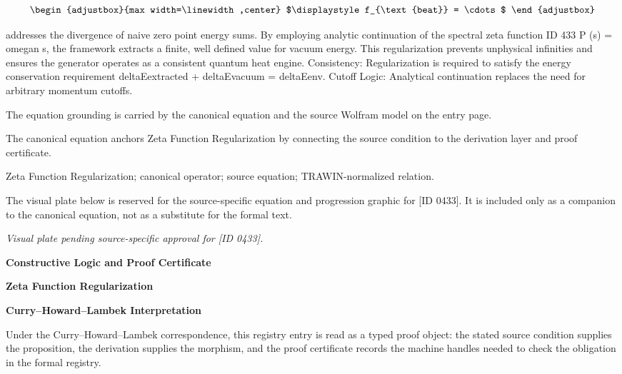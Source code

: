 \[
\begin{adjustbox}{max width=\linewidth,center}
$\displaystyle
f_{\text{beat}} = \cdots
$
\end{adjustbox}
\]

addresses the divergence of naive zero point energy sums. By employing analytic continuation of the spectral zeta function ID 433 P (s) = omegan s, the framework extracts a finite, well defined value for vacuum energy. This regularization prevents unphysical infinities and ensures the generator operates as a consistent quantum heat engine. Consistency: Regularization is required to satisfy the energy conservation requirement deltaEextracted + deltaEvacuum = deltaEenv. Cutoff Logic: Analytical continuation replaces the need for arbitrary momentum cutoffs.

The equation grounding is carried by the canonical equation and the source Wolfram model on the entry page.

The canonical equation anchors Zeta Function Regularization by connecting the source condition to the derivation layer and proof certificate.

Zeta Function Regularization; canonical operator; source equation; TRAWIN-normalized relation.
\endgroup

\begingroup\footnotesize\sloppy
The visual plate below is reserved for the source-specific equation and progression graphic for [ID 0433]. It is included only as a companion to the canonical equation, not as a substitute for the formal text.
\par\endgroup
\begingroup\footnotesize\itshape
Visual plate pending source-specific approval for [ID 0433].
\par\endgroup

\clearpage
\begingroup\tzpsupportsetup
\noindent\textbf{\fontsize{10.8pt}{12.8pt}\selectfont [ID 0433] Constructive Logic and Proof Certificate}\par
\noindent\textbf{\fontsize{10pt}{12pt}\selectfont Zeta Function Regularization}\par
\vspace{0.45em}
\begingroup
\footnotesize
\setlength{\parskip}{0.22em}
\setlength{\parindent}{0pt}
\noindent\textbf{Curry--Howard--Lambek Interpretation}\par
Under the Curry--Howard--Lambek correspondence, this registry entry is read as a typed proof
object: the stated source condition supplies the proposition, the derivation supplies the
morphism, and the proof certificate records the machine handles needed to check the obligation
in the formal registry.

